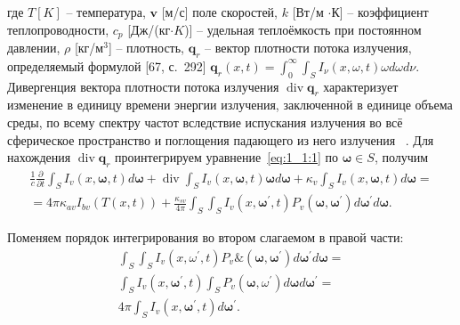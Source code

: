 где $T[K]$ -- температура, $\mathbf{v}$ [м/с] поле скоростей, $k$ [Вт/м $\cdot К$]
-- коэффициент теплопроводности, $c_p$ [Дж/(кг$\cdot K$)] --
удельная теплоёмкость при постоянном
давлении, $\rho$ [кг/$\text{м}^3$] -- плотность,
$\mathbf{q}_r$ -- вектор плотности потока излучения, определяемый формулой [67, с.\ 292]
$\mathbf{q}_r(x, t) = \int^\infty_0\int_S I_\nu(x,\omega,t)\omega d\omega d\nu$.
Дивергенция вектора плотности потока излучения $\operatorname{div} \mathbf{q}_r$
характеризует изменение в единицу времени энергии излучения,
заключенной в единице объема среды, по всему спектру частот вследствие испускания
излучения во всё сферическое пространство и поглощения падающего
из него излучения ~\cite[274]{Ozisik1976}.
Для нахождения $\operatorname{div} \mathbf{q}_{r}$ проинтегрируем
уравнение~\eqref{eq:1_1:1} по $\boldsymbol{\omega} \in S$, получим
\[
    \begin{gathered}
        \frac{1}{c} \frac{\partial}{\partial t}
        \int_{S} I_{v}(x, \boldsymbol{\omega}, t) d
        \boldsymbol{\omega}+\operatorname{div}
        \int_{S} I_{v}(x, \boldsymbol{\omega}, t) \boldsymbol{\omega} d
        \boldsymbol{\omega}+\kappa_{v}
        \int_{S} I_{v}(x, \boldsymbol{\omega}, t) d \boldsymbol{\omega}= \\
        = 4 \pi \kappa_{a v} I_{b v}(T(x, t))+\frac{\kappa_{s v}}{4 \pi} \int_{S}
        \int_{S} I_{v}\left(x, \boldsymbol{\omega}^{\prime},
        t\right) P_{v}\left(\boldsymbol{\omega},
        \boldsymbol{\omega}^{\prime}\right) d
        \boldsymbol{\omega}^{\prime} d \boldsymbol{\omega}.
    \end{gathered}
\]


Поменяем порядок интегрирования во втором слагаемом в правой части:
\[
    \begin{gathered}
        \int_{S} \int_{S} I_{v}\left(x, \omega^{\prime}, t\right) P_{v}
        \&\left(\boldsymbol{\omega},
        \boldsymbol{\omega}^{\prime}\right)
        d \boldsymbol{\omega}^{\prime} d \boldsymbol{\omega} = \\
        \int_{S} I_{v}\left(x, \boldsymbol{\omega}^{\prime}, t\right)
        \int_{S} P_{v}\left(\boldsymbol{\omega},
        \omega^{\prime}\right) d \boldsymbol{\omega}
        d \boldsymbol{\omega}^{\prime} = \\
        4 \pi \int_{S} I_{v}\left(x,
        \boldsymbol{\omega}^{\prime}, t\right) d \boldsymbol{\omega}^{\prime}.
    \end{gathered}
\]



